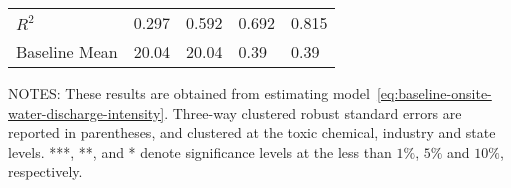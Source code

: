 \begin{table}[H]
{\begin{tabular}{@{}lllll@{}}
            $R^2$              & 0.297     & 0.592     & 0.692     & 0.815     \\
            Baseline Mean      & 20.04     & 20.04     & 0.39      & 0.39      \\ \bottomrule\bottomrule
        \end{tabular}%
    }
    \begin{minipage}{\columnwidth}
        \vspace{0.05in}
        \tiny NOTES: These results are obtained from estimating model~\ref{eq:baseline-onsite-water-discharge-intensity}. Three-way clustered robust standard errors are reported in parentheses, and clustered at the toxic chemical, industry and state levels. ***, **, and * denote significance levels at the less than $1\%$, $5\%$ and $10\%$, respectively.
    \end{minipage}
\end{table}